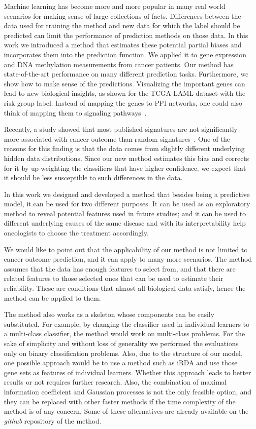 Machine learning has become more and more popular in many real world scenarios for making sense of large collections of facts. Differences between the data used for training the method and new data for which the label should be predicted can limit the performance of prediction methods on those data. In this work we introduced a method that estimates these potential partial biases and incorporates them into the prediction function. We applied it to gene expression and DNA methylation measurements from cancer patients. Our method has state-of-the-art performance on many different prediction tasks. Furthermore, we show how to make sense of the predictions. Visualizing the important genes can lead to new biological insights, as shown for the TCGA-LAML dataset with the risk group label. Instead of mapping the genes to PPI networks, one could also think of mapping them to signaling pathways~\cite{Kanehisa2014}.

Recently, a study showed that most published signatures are not significantly more associated with cancer outcome than random signatures~\cite{Venet2011}. One of the reasons for this finding is that the data comes from slightly different underlying hidden data distributions. Since our new method estimates this bias and corrects for it by up-weighting the classifiers that have higher confidence, we expect that it should be less susceptible to such differences in the data.

In this work we designed and developed a method that besides being a predictive model, it can be used for two different purposes. It can be used as an exploratory method to reveal potential features used in future studies; and it can be used to different underlying causes of the same disease and with its interpretability help oncologists to choose the treatment accordingly.

We would like to point out that the applicability of our method is not limited to cancer outcome prediction, and it can apply to many more scenarios. The method assumes that the data has enough features to select from, and that there are related features to those selected ones that can be used to estimate their reliability. These are conditions that almost all biological data satisfy, hence the method can be applied to them.

The method also works as a skeleton whose components can be easily
substituted. For example, by changing the classifier used in
individual learners to a multi-class classifier, the method would work
on multi-class problems. For the sake of simplicity and without loss
of generality we performed the evaluations only on binary
classification problems. Also, due to the structure of our model, one possible approach would be to use a method such as iRDA and use those gene sets as features of individual learners. Whether this approach leads to better results or not requires further research.
Also, the combination of maximal information coefficient and Gaussian
processes is not the only feasible option, and they can be replaced
with other faster methods if the time complexity of the method is of
any concern. Some of these alternatives are already available on the
\emph{github} repository of the method.

